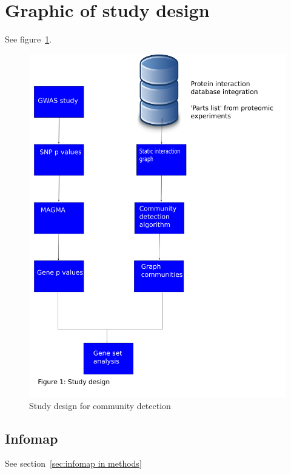 \section{Graphic of study design}
See figure~\ref{fig:study design community detection}.
\begin{figure}
    \centering
    \includegraphics[width=\textwidth]{images/study_design.png}  
    \caption{Study design for community detection}
    \label{fig:study design community detection}
\end{figure}








\subsection{Infomap}
See section~\ref{sec:infomap in methods}

